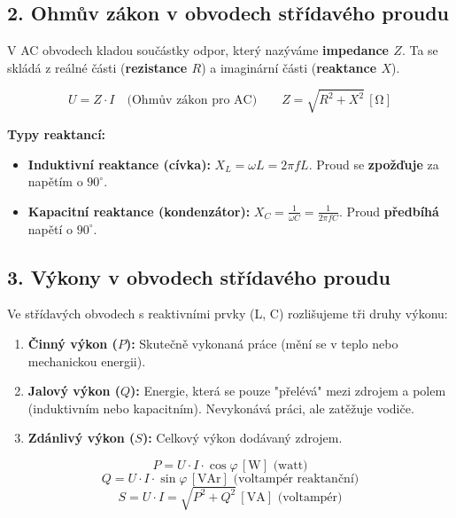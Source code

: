 \documentclass[a4paper,10pt]{article}
\newcommand{\jednotka}[1]{\,[\mathrm{#1}]}
\begin{document}
\begin{vysvetlenibox}
\subsection*{2. Ohmův zákon v obvodech střídavého proudu}

V AC obvodech kladou součástky odpor, který nazýváme \textbf{impedance $Z$}. Ta se skládá z reálné části (\textbf{rezistance $R$}) a imaginární části (\textbf{reaktance $X$}).

\begin{vzorcebox}
\[
U = Z \cdot I \quad \text{(Ohmův zákon pro AC)}
\qquad
Z = \sqrt{R^2 + X^2} \jednotka{\Omega}
\]
\end{vzorcebox}

\textbf{Typy reaktancí:}
\begin{itemize}
  \item \textbf{Induktivní reaktance (cívka):} $X_L = \omega L = 2\pi f L$. Proud se \textbf{zpožďuje} za napětím o $90^\circ$.
  \item \textbf{Kapacitní reaktance (kondenzátor):} $X_C = \frac{1}{\omega C} = \frac{1}{2\pi f C}$. Proud \textbf{předbíhá} napětí o $90^\circ$.
\end{itemize}

\subsection*{3. Výkony v obvodech střídavého proudu}

Ve střídavých obvodech s reaktivními prvky (L, C) rozlišujeme tři druhy výkonu:

\begin{enumerate}
  \item \textbf{Činný výkon ($P$):} Skutečně vykonaná práce (mění se v teplo nebo mechanickou energii).
  \item \textbf{Jalový výkon ($Q$):} Energie, která se pouze "přelévá" mezi zdrojem a polem (induktivním nebo kapacitním). Nevykonává práci, ale zatěžuje vodiče.
  \item \textbf{Zdánlivý výkon ($S$):} Celkový výkon dodávaný zdrojem.
\end{enumerate}

\begin{vzorcebox}
\[
P = U \cdot I \cdot \cos \varphi \jednotka{W} \text{ (watt)}
\]
\[
Q = U \cdot I \cdot \sin \varphi \jednotka{VAr} \text{ (voltampér reaktanční)}
\]
\[
S = U \cdot I = \sqrt{P^2 + Q^2} \jednotka{VA} \text{ (voltampér)}
\]
\end{vzorcebox}


\end{vysvetlenibox}
\end{document}
